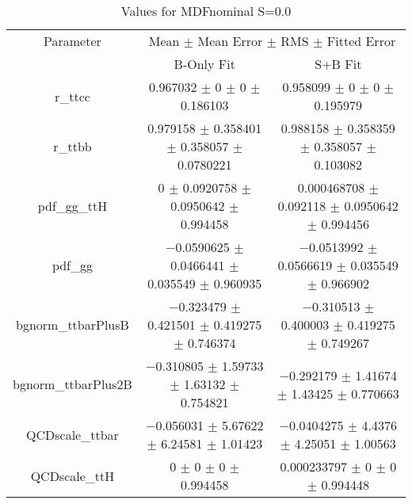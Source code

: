 \begin{table}
\centering
\caption{Values for MDFnominal S=0.0}
\begin{tabular}{ccc}
\toprule
Parameter & \multicolumn{2}{c}{Mean $\pm$ Mean Error $\pm$ RMS $\pm$ Fitted Error}\\
 & B-Only Fit & S+B Fit\\
\midrule
r\_ttcc & \num{0.967032} $\pm$ \num{0} $\pm$ \num{0} $\pm$ \num{0.186103} & \num{0.958099} $\pm$ \num{0} $\pm$ \num{0} $\pm$ \num{0.195979}\\
r\_ttbb & \num{0.979158} $\pm$ \num{0.358401} $\pm$ \num{0.358057} $\pm$ \num{0.0780221} & \num{0.988158} $\pm$ \num{0.358359} $\pm$ \num{0.358057} $\pm$ \num{0.103082}\\
pdf\_gg\_ttH & \num{0} $\pm$ \num{0.0920758} $\pm$ \num{0.0950642} $\pm$ \num{0.994458} & \num{0.000468708} $\pm$ \num{0.092118} $\pm$ \num{0.0950642} $\pm$ \num{0.994456}\\
pdf\_gg & \num{-0.0590625} $\pm$ \num{0.0466441} $\pm$ \num{0.035549} $\pm$ \num{0.960935} & \num{-0.0513992} $\pm$ \num{0.0566619} $\pm$ \num{0.035549} $\pm$ \num{0.966902}\\
bgnorm\_ttbarPlusB & \num{-0.323479} $\pm$ \num{0.421501} $\pm$ \num{0.419275} $\pm$ \num{0.746374} & \num{-0.310513} $\pm$ \num{0.400003} $\pm$ \num{0.419275} $\pm$ \num{0.749267}\\
bgnorm\_ttbarPlus2B & \num{-0.310805} $\pm$ \num{1.59733} $\pm$ \num{1.63132} $\pm$ \num{0.754821} & \num{-0.292179} $\pm$ \num{1.41674} $\pm$ \num{1.43425} $\pm$ \num{0.770663}\\
QCDscale\_ttbar & \num{-0.056031} $\pm$ \num{5.67622} $\pm$ \num{6.24581} $\pm$ \num{1.01423} & \num{-0.0404275} $\pm$ \num{4.4376} $\pm$ \num{4.25051} $\pm$ \num{1.00563}\\
QCDscale\_ttH & \num{0} $\pm$ \num{0} $\pm$ \num{0} $\pm$ \num{0.994458} & \num{0.000233797} $\pm$ \num{0} $\pm$ \num{0} $\pm$ \num{0.994448}\\
\bottomrule
\end{tabular}
\end{table}